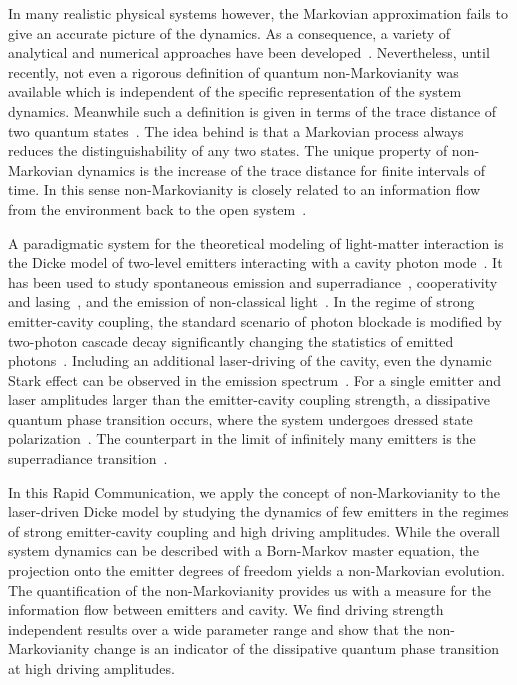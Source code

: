 \documentclass[aps,pra,twocolumn,showpacs,showkeys,10pt,nofootinbib]{revtex4-1}
\begin{document}
In many realistic physical systems however, the Markovian approximation fails to give an accurate picture of the dynamics.
As a consequence, a variety of analytical and numerical approaches have been developed~\cite{pmhs08, wecc08, rhp10, dva17, blpv16, blp09, lpb10}.
Nevertheless, until recently, not even a rigorous definition of quantum non-Markovianity was available which is independent of the specific representation of the system dynamics.
Meanwhile such a definition is given in terms of the trace distance of two quantum states~\cite{blp09, lpb10}.
The idea behind is that a Markovian process always reduces the distinguishability of any two states.
The unique property of non-Markovian dynamics is the increase of the trace distance for finite intervals of time.
In this sense non-Markovianity is closely related to an information flow from the environment back to the open system~\cite{wc08, blp09, lpb10}.

A paradigmatic system for the theoretical modeling of light-matter interaction is the Dicke model of two-level emitters interacting with a cavity photon mode~\cite{dic54}.
It has been used to study spontaneous emission and superradiance~\cite{bsh71, gh82, mh10, berb12}, cooperativity and lasing~\cite{agpds11, lldvfvb11, mgsa13}, and the emission of non-classical light~\cite{at91, que12, rsh13, paf15}.
In the regime of strong emitter-cavity coupling, the standard scenario of photon blockade is modified by two-photon cascade decay significantly changing the statistics of emitted photons~\cite{srdshs13, paf15}.
Including an additional laser-driving of the cavity, even the dynamic Stark effect can be observed in the emission spectrum~\cite{paf17}.
For a single emitter and laser amplitudes larger than the emitter-cavity coupling strength, a dissipative quantum phase transition occurs, where the system undergoes dressed state polarization~\cite{sc88, ac91, car15, agc92}.
The counterpart in the limit of infinitely many emitters is the superradiance transition~\cite{bsh71, gh82, dtdlss13}.

In this Rapid Communication, we apply the concept of non-Markovianity to the laser-driven Dicke model by studying the dynamics of few emitters in the regimes of strong emitter-cavity coupling and high driving amplitudes.
While the overall system dynamics can be described with a Born-Markov master equation, the projection onto the emitter degrees of freedom yields a non-Markovian evolution.
The quantification of the non-Markovianity provides us with a measure for the information flow between emitters and cavity.
We find driving strength independent results over a wide parameter range and show that the non-Markovianity change is an indicator of the dissipative quantum phase transition at high driving amplitudes.
\end{document}
